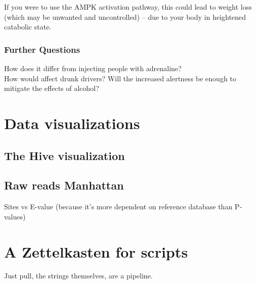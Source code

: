 \documentclass[11.5pt]{report}
\begin{document}
If you were to use the AMPK activation pathway, this could lead to weight loss (which may be unwanted and uncontrolled) -- due to your body in heightened catabolic state. 





\subsection{Further Questions}
How does it differ from injecting people with adrenaline? \\
How would affect drunk drivers? Will the increased alertness be enough to mitigate the effects of alcohol? \\





\chapter{Data visualizations}
\section{The Hive visualization}
\section{Raw reads Manhattan}
Sites vs E-value (because it's more dependent on reference database than P-values)



\chapter{A Zettelkasten for scripts}
Just pull, the strings themselves, are a pipeline. 

	
\end{document}
